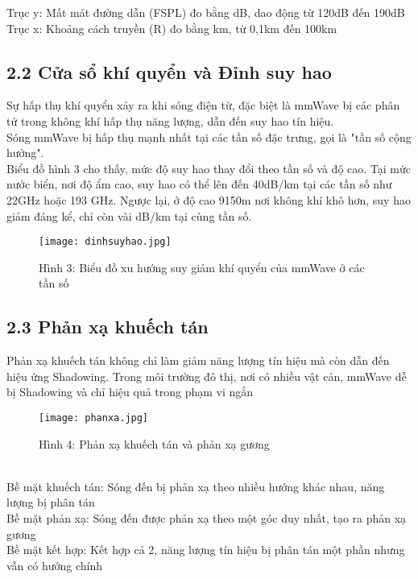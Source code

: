 \documentclass[a4paper,13pt]{article} %
\begin{document}
Trục y: Mất mát đường dẫn (FSPL) đo bằng dB, dao động từ 120dB đến 190dB\\

Trục x: Khoảng cách truyền (R) đo bằng km, từ 0,1km đến 100km

\subsection{2.2 Cửa sổ khí quyển và Đỉnh suy hao}
Sự hấp thụ khí quyển xảy ra khi sóng điện từ, đặc biệt là mmWave bị các phân tử trong không khí hấp thụ năng lượng, dẫn đến suy hao tín hiệu. \\
Sóng mmWave bị hấp thụ mạnh nhất tại các tần số đặc trưng, gọi là "tần số cộng hưởng". \\
Biểu đồ hình 3 cho thấy, mức độ suy hao thay đổi theo tần số và độ cao. Tại mức nước biển, nơi độ ẩm cao, suy hao có thể lên đến 40dB/km tại các tần số như 22GHz hoặc 193 GHz. Ngược lại, ở độ cao 9150m nơi không khí khô hơn, suy hao giảm đáng kể, chỉ còn vài dB/km tại cùng tần số.
\begin{figure}[htbp]
    \centering
    \texttt{[image: dinhsuyhao.jpg]}
    \caption*{Hình 3: Biểu đồ xu hướng suy giảm khí quyển của mmWave ở các tần số \cite{key2} }
    \label{fig:model}
\end{figure}

\subsection{2.3 Phản xạ khuếch tán}
Phản xạ khuếch tán không chỉ làm giảm năng lượng tín hiệu mà còn dẫn đến hiệu ứng Shadowing. Trong môi trường đô thị, nơi có nhiều vật cản, mmWave dễ bị Shadowing và chỉ hiệu quả trong phạm vi ngắn
\begin{figure}[htbp]
    \centering
    \texttt{[image: phanxa.jpg]}
    \caption*{Hình 4: Phản xạ khuếch tán và phản xạ gương \cite{key2} }
    \label{fig:model}
\end{figure} \\
Bề mặt khuếch tán: Sóng đến bị phản xạ theo nhiều hướng khác nhau, năng lượng bị phân tán \\
Bề mặt phản xạ: Sóng đến được phản xạ theo một góc duy nhất, tạo ra phản xạ gương \\
Bề mặt kết hợp: Kết hợp cả 2, năng lượng tín hiệu bị phân tán một phần nhưng vẫn có hướng chính\\
\end{document}
